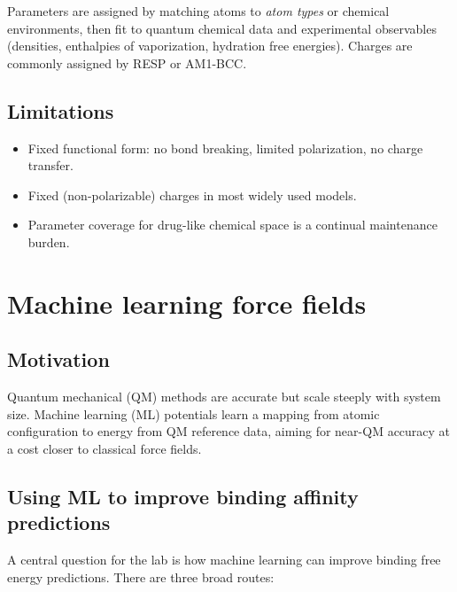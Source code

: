 \documentclass[english,course]{lecture}
\begin{document}
Parameters are assigned by matching atoms to \emph{atom types} or chemical environments, then fit to quantum chemical data and experimental observables (densities, enthalpies of vaporization, hydration free energies). Charges are commonly assigned by RESP or AM1-BCC.

\subsection{Limitations}

\begin{itemize}
    \item Fixed functional form: no bond breaking, limited polarization, no charge transfer.
    \item Fixed (non-polarizable) charges in most widely used models.
    \item Parameter coverage for drug-like chemical space is a continual maintenance burden.
\end{itemize}

\vfill
\eject


\section{Machine learning force fields}

\subsection{Motivation}

Quantum mechanical (QM) methods are accurate but scale steeply with system size. Machine learning (ML) potentials learn a mapping from atomic configuration to energy from QM reference data, aiming for near-QM accuracy at a cost closer to classical force fields.

\subsection{Using ML to improve binding affinity predictions}

A central question for the lab is how machine learning can improve binding free energy predictions. There are three broad routes:
\end{document}
